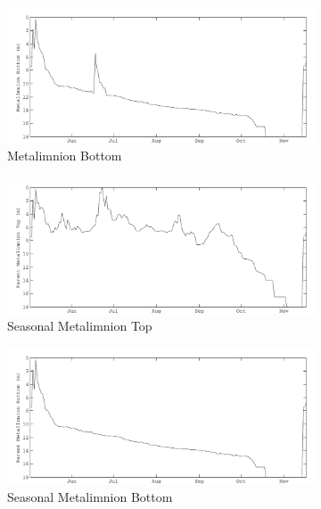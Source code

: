 \begin{figure}
    \begin{subfigure}{\lafigsize}
      \caption{\label{fig:la:out:metaB}Metalimnion Bottom}
      \includegraphics[width = \linewidth]{figures/Sparkling_metaB.pdf}
    \end{subfigure}
    \begin{subfigure}{\lafigsize}
      \caption{\label{fig:la:out:SmetaT}Seasonal Metalimnion Top}
      \includegraphics[width = \linewidth]{figures/Sparkling_SmetaT.pdf}
    \end{subfigure}
    \begin{subfigure}{\lafigsize}
      \caption{\label{fig:la:out:SmetaB}Seasonal Metalimnion Bottom}
      \includegraphics[width = \linewidth]{figures/Sparkling_SmetaB.pdf}
    \end{subfigure}
    \begin{subfigure}{\lafigsize}

\end{subfigure}
\end{figure}
